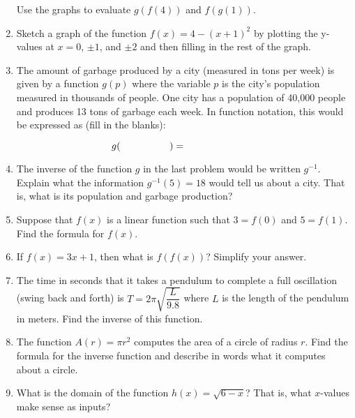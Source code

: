 \documentclass[10pt]{article}
\begin{document}
\begin{enumerate}
Use the graphs to evaluate $g(f(4))$ and $f(g(1))$. 
\vfill

\item Sketch a graph of the function $f(x) = 4-(x+1)^2$ by plotting the y-values at $x = 0$, $\pm 1$, and $\pm 2$ and then filling in the rest of the graph. 
\vfill
\vfill
\vfill

\newpage
\item The amount of garbage produced by a city (measured in tons per week) is given by a function $g(p)$ where the variable $p$ is the city's population measured in thousands of people.  One city has a population of 40,000 people and produces 13 tons of garbage each week.  In function notation, this would be expressed as (fill in the blanks): 

{\LARGE
$$ g( \hspace{0.7in} ) = {\hspace*{1in}}$$ 
}

\item The inverse of the function $g$ in the last problem would be written $g^{-1}$. Explain what the information $g^{-1}(5) = 18$ would tell us about a city. That is, what is its population and garbage production? 
\vfill

\item Suppose that $f(x)$ is a linear function such that $3 =f(0)$ and $5 = f(1)$. Find the formula for $f(x)$. 
\vfill

\item If $f(x) = 3x+1$, then what is $f(f(x))$? Simplify your answer.  
\vfill




\item The time in seconds that it takes a pendulum to complete a full oscillation (swing back and forth) is $T = 2 \pi \sqrt{\dfrac{L}{9.8}}$ where $L$ is the length of the pendulum in meters.  Find the inverse of this function.  
\vfill 

\item The function $A(r) = \pi r^2$ computes the area of a circle of radius $r$. Find the formula for the inverse function and describe in words what it computes about a circle.
\vfill

\item What is the domain of the function $h(x) = \sqrt{6-x}$? That is, what $x$-values make sense as inputs?
\vfill


\setcounter{enumCount}{\theenumi}
\end{enumerate}
\end{document}
